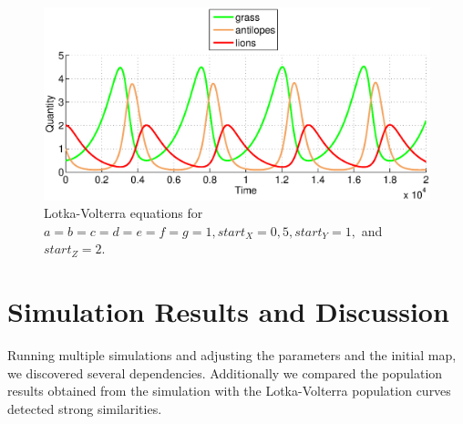 \documentclass[11pt]{article}
\begin{document}
\begin{figure}
\centering
\includegraphics[scale=0.65]{LotkaVolterraThreeAllOnes}
\caption{Lotka-Volterra equations for $a=b=c=d=e=f=g=1,start_X=0,5, start_Y=1,$ and $start_Z=2$.}
\label{fig:LotkaVolterraThreeAllOnes}
\end{figure}

\section{Simulation Results and Discussion}
Running multiple simulations and adjusting the parameters and the initial map, we discovered several dependencies. Additionally we compared the population results obtained from the simulation with the Lotka-Volterra population curves detected strong similarities.
\end{document}
